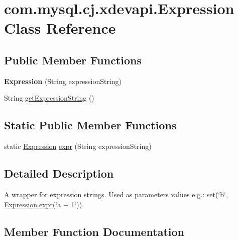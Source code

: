 \hypertarget{classcom_1_1mysql_1_1cj_1_1xdevapi_1_1_expression}{}\section{com.\+mysql.\+cj.\+xdevapi.\+Expression Class Reference}
\label{classcom_1_1mysql_1_1cj_1_1xdevapi_1_1_expression}
\subsection*{Public Member Functions}
\begin{DoxyCompactItemize}
\item 
\mbox{\label{classcom_1_1mysql_1_1cj_1_1xdevapi_1_1_expression_a1a78153ccd1e20254c80a716a587980f}} 
{\bfseries Expression} (String expression\+String)
\item 
String \mbox{\hyperlink{classcom_1_1mysql_1_1cj_1_1xdevapi_1_1_expression_a2ca4402a9e5b44533844931a24ccda22}{get\+Expression\+String}} ()
\end{DoxyCompactItemize}
\subsection*{Static Public Member Functions}
\begin{DoxyCompactItemize}
\item 
static \mbox{\hyperlink{classcom_1_1mysql_1_1cj_1_1xdevapi_1_1_expression}{Expression}} \mbox{\hyperlink{classcom_1_1mysql_1_1cj_1_1xdevapi_1_1_expression_a6e712ed08267a9450ec8012acd30a739}{expr}} (String expression\+String)
\end{DoxyCompactItemize}


\subsection{Detailed Description}
A wrapper for expression strings. Used as parameters values e.\+g.\+: {\ttfamily set(\char`\"{}b\char`\"{}, \mbox{\hyperlink{classcom_1_1mysql_1_1cj_1_1xdevapi_1_1_expression_a6e712ed08267a9450ec8012acd30a739}{Expression.\+expr}}(\char`\"{}a + 1\char`\"{}))}. 

\subsection{Member Function Documentation}
\mbox{\label{classcom_1_1mysql_1_1cj_1_1xdevapi_1_1_expression_a6e712ed08267a9450ec8012acd30a739}} 
